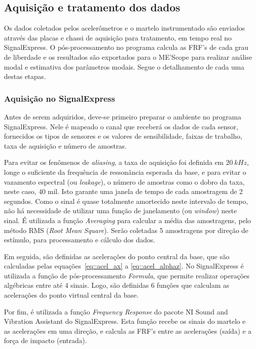 \subsection{Aquisição e tratamento dos dados}

Os dados coletados pelos acelerômetros e o martelo instrumentado são enviados
através das placas e chassi de aquisição para tratamento, em tempo real no
SignalExpress. O pós-processamento no programa calcula as FRF's de cada grau de
liberdade e os resultados são exportados para o ME'Scope para realizar análise
modal e estimativa dos parâmetros modais. Segue o detalhamento de cada uma
destas etapas.

\subsubsection{Aquisição no SignalExpress}

Antes de serem adquiridos, deve-se primeiro preparar o ambiente no
programa SignalExpress. Nele é mapeado o canal que receberá os dados
de cada sensor, fornecidos os tipos de sensores e os valores de sensibilidade,
faixas de trabalho, taxa de aquisição e número de amostras.

Para evitar os fenômenos de \textit{aliasing}, a taxa de aquisição foi definida
em $20~kHz$, longe o suficiente da frequência de
ressonância esperada da base, e para evitar o vazamento espectral (ou
\textit{leakage}), o número de amostras como o dobro da taxa, neste caso, $40$
mil. Isto garante uma janela de tempo de cada amostragem de 2 segundos. Como o
sinal é quase totalmente amortecido neste intervalo de tempo, não há necessidade
de utilizar uma função de janelamento (ou \textit{window}) neste sinal.
É utilizada a função \textit{Averaging} para calcular a média das amostragens,
pelo método RMS (\textit{Root Mean Square}).
Serão coletadas 5 amostragens por direção de estímulo, para processamento e
cálculo dos dados.

Em seguida, são definidas as acelerações do ponto central da base, que são
calculadas pelas equações~\ref{eq::acel_ax} a \ref{eq::acel_alphaz}. No
SignalExpress é utilizada a função de pós-processamento \textit{Formula}, que
permite realizar operações algébricas entre até 4 sinais. Logo, são definidas 6
funções que calculam as acelerações do ponto virtual central da base.

Por fim, é utilizada a função \textit{Frequency Response} do pacote NI Sound and
Vibration Assistant do SignalExpress. Esta função recebe  os sinais do
martelo e as acelerações em uma direção, e calcula as FRF's
entre as acelerações (saída) e a força de impacto (entrada).

